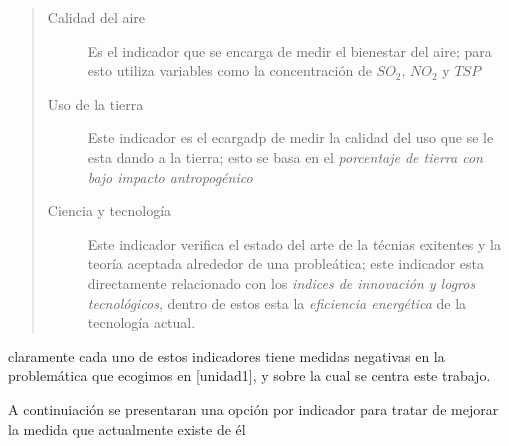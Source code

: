 \documentclass[12pt]{article}
\begin{document}
	\begin{quote}\begin{description}
	
		\item [Calidad del aire] Es el indicador que se encarga de medir el bienestar del aire; para esto utiliza variables como la concentraci\'on de $SO_2$, $NO_2$ y $TSP$
		\item [Uso de la tierra] Este indicador es el ecargadp de medir la calidad del uso que se le esta dando a la tierra; esto se basa en el \textit{porcentaje de tierra con bajo impacto antropog\'enico}
		\item [Ciencia y tecnolog\'ia] Este indicador verifica el estado del arte de la t\'ecnias exitentes y la teor\'ia aceptada alrededor de una proble\'atica; este indicador esta directamente relacionado con los \textit{indices de innovaci\'on y logros tecnol\'ogicos}, dentro de estos esta la \textit{eficiencia energ\'etica} de la tecnolog\'ia actual.
		
	\end{description}\end{quote}
	claramente cada uno de estos indicadores tiene medidas negativas en la problem\'atica que ecogimos en [unidad1], y sobre la cual se centra este trabajo.
	\par A continuiaci\'on se presentaran una opci\'on por indicador para tratar de mejorar la medida que actualmente existe de \'el
\end{document}
